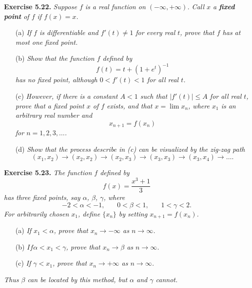 \documentclass{article}
\begin{document}
\textbf{Exercise 5.22.}
\emph{Suppose $f$ is a real function on $(-\infty,+\infty)$.
Call $x$ a \textbf{fixed point} of $f$ if $f(x)=x$.}
\begin{enumerate}
  \item[(a)]
  \emph{If $f$ is differentiable and $f'(t) \neq 1$ for every real $t$,
  prove that $f$ has at most one fixed point.}

  \item[(b)]
  \emph{Show that the function $f$ defined by
  \[
    f(t) = t+(1+e^t)^{-1}
  \]
  has no fixed point, although $0 < f'(t) < 1$ for all real $t$.}

  \item[(c)]
  \emph{However, if there is a constant $A<1$ such that $|f'(t)| \leq A$ for all real $t$,
  prove that a fixed point $x$ of $f$ exists,
  and that $x = \lim x_n$, where $x_1$ is an arbitrary real number and
  \[
    x_{n+1} = f(x_n)
  \]
  for $n = 1,2,3,\ldots$.}

  \item[(d)]
  \emph{Show that the process describe in (c) can be visualized by the zig-zag path
  \[
    (x_1,x_2) \to (x_2,x_2) \to (x_2,x_3) \to (x_3,x_3) \to (x_3,x_4) \to \ldots.
  \]}
  \end{enumerate}





\textbf{Exercise 5.23.}
\emph{The function $f$ defined by
\[
  f(x) = \frac{x^3 + 1}{3}
\]
has three fixed points, say $\alpha$, $\beta$, $\gamma$, where
\[
  −2 < \alpha < −1, \:\:\:\:\:\:\:\:
  0 < \beta < 1, \:\:\:\:\:\:\:\:
  1 < \gamma < 2.
\]
For arbitrarily chosen $x_1$, define $\{x_n\}$ by setting $x_{n+1} = f(x_n)$.}
\begin{enumerate}
  \item[(a)]
  \emph{If $x_1 < \alpha$, prove that $x_n \to -\infty$ as $n \to \infty$.}

  \item[(b)]
  \emph{$If \alpha < x_1 < \gamma$, prove that $x_n \to \beta$ as $n \to \infty$.}

  \item[(c)]
  \emph{If $\gamma < x_1$, prove that $x_n \to +\infty$ as $n \to \infty$.}
  \end{enumerate}
\emph{Thus $\beta$ can be located by this method,
but $\alpha$ and $\gamma$ cannot.} \\
\end{document}
